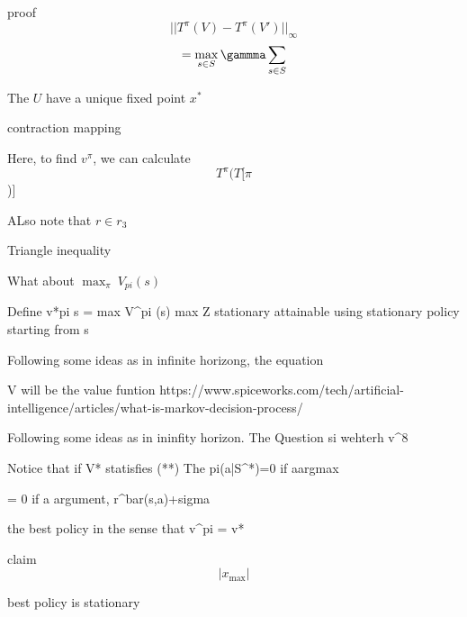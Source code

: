 \documentclass[11pt]{article}
\begin{document}
proof
    \[||{T}^{\pi}({V})-{T}^{\pi}({V'})||_{\infty}\]
    \[= \max_{s \in S} {\gammma} \sum_{s \in S}\]

    The \(U\) have a unique fixed point \({x}^{*}\)

contraction mapping

    Here, to find \({v}^{\pi}\),  we can calculate \[{T}^{\pi}({T}[\pi\])]\]

ALso note that \({r \in {r}_{3}}\)


    Triangle inequality


    What about \(\max_{\pi}\ {V}_{pi}(s)\)

    Define v*pi s = max V^pi (s) max Z stationary
    attainable using stationary
    policy starting from s


    Following some ideas as in infinite horizong, the equation

    V will be the value funtion
    https://www.spiceworks.com/tech/artificial-intelligence/articles/what-is-markov-decision-process/

    Following some ideas as in ininfity horizon. The Question si wehterh v^8

    Notice that if V* statisfies (**)
    The pi(a|S^*)=0 if a\notin argmax

    = 0 if a \notin argument,  r^bar(s,a)+sigma


    the best policy in the sense that v^pi = v*


claim
\[|{x}_{\max}|\]

    best policy is stationary
\end{document}
